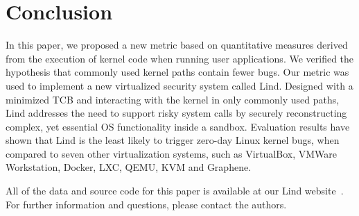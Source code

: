 \section{Conclusion}
\label{sec.conclusion}

%
In this paper, we proposed a new metric based on quantitative measures derived from
the execution of kernel code when running user applications.
We verified the hypothesis that commonly used kernel paths contain fewer bugs.
Our metric was used to implement a new virtualized security system called Lind. Designed with a minimized
TCB and interacting with the kernel in only commonly used paths, Lind addresses the need to 
support risky system calls by securely reconstructing complex, yet essential OS functionality inside a sandbox.
%
Evaluation results have shown that Lind is the least likely to trigger zero-day Linux kernel bugs,
when compared to seven other virtualization systems, such as VirtualBox, VMWare Workstation, Docker, LXC, 
QEMU, KVM and Graphene.

All of the data and source code for this paper is available at our Lind website~\cite{Lind}. 
For further information and questions, please contact the authors. 
